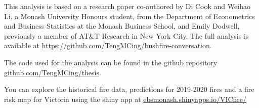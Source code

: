 \documentclass[
  11pt,
  a4paper,
]{article}
\begin{document}
This analysis is based on a research paper co-authored by Di Cook and Weihao Li, a Monash University Honours student, from the Department of Econometrics and Business Statistics at the Monash Business School, and Emily Dodwell, previously a member of AT\&T Research in New York City. The full analysis is available at \url{https://github.com/TengMCing/bushfire-conversation}.

The code used for the analysis can be found in the github repository \href{https://github.com/TengMCing/thesis}{github.com/TengMCing/thesis}.

You can explore the historical fire data, predictions for 2019-2020 fires and a fire risk map for Victoria using the shiny app at \href{https://ebsmonash.shinyapps.io/VICfire/}{ebsmonash.shinyapps.io/VICfire/}

\printbibliography
\end{document}
